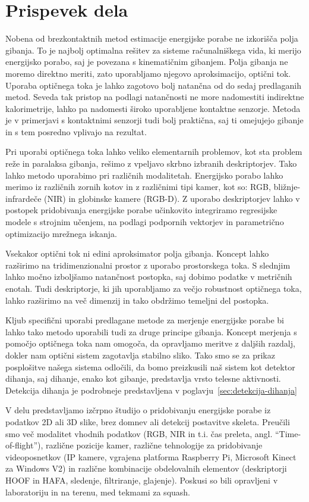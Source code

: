 \section{Prispevek dela}
Nobena od brezkontaktnih metod estimacije energijske porabe ne izkorišča polja gibanja. To je najbolj optimalna rešitev za sisteme računalniškega vida, ki merijo energijsko porabo, saj je povezana s kinematičnim gibanjem. Polja gibanja ne moremo direktno meriti, zato uporabljamo njegovo aproksimacijo, optični tok. Uporaba optičnega toka je lahko zagotovo bolj natančna od do sedaj predlaganih metod. Seveda tak pristop na podlagi natančnosti ne more nadomestiti indirektne kalorimetrije, lahko pa nadomesti široko uporabljene kontaktne senzorje. Metoda je v primerjavi s kontaktnimi senzorji tudi bolj praktična, saj ti omejujejo gibanje in s tem posredno vplivajo na rezultat. 

Pri uporabi optičnega toka lahko veliko elementarnih problemov, kot sta problem reže in paralaksa gibanja, rešimo z vpeljavo skrbno izbranih deskriptorjev. Tako lahko metodo uporabimo pri različnih modalitetah. Energijsko porabo lahko merimo iz različnih zornih kotov in z različnimi tipi kamer, kot so: RGB, bližnje-infrardeče (NIR) in globinske kamere (RGB-D). Z uporabo deskriptorjev lahko v postopek pridobivanja energijske porabe učinkovito integriramo regresijske modele s strojnim učenjem, na podlagi podpornih vektorjev in parametrično optimizacijo mrežnega iskanja. 

Vsekakor optični tok ni edini aproksimator polja gibanja. Koncept lahko razširimo na tridimenzionalni prostor z uporabo prostorskega toka. S slednjim lahko močno izboljšamo natančnost postopka, saj dobimo podatke v metričnih enotah. Tudi deskriptorje, ki jih uporabljamo za večjo robustnost optičnega toka, lahko razširimo na več dimenzij in tako obdržimo temeljni del postopka.

Kljub specifični uporabi predlagane metode za merjenje energijske porabe bi lahko tako metodo uporabili tudi za druge principe gibanja. Koncept merjenja s pomočjo optičnega toka nam omogoča, da opravljamo meritve z daljših razdalj, dokler nam optični sistem zagotavlja stabilno sliko. Tako smo se za prikaz posplošitve našega sistema odločili, da bomo preizkusili naš sistem kot detektor dihanja, saj dihanje, enako kot gibanje, predstavlja vrsto telesne aktivnosti. Detekcija dihanja je podrobneje predstavljena v poglavju~\ref{sec:detekcija-dihanja}

V delu predstavljamo izčrpno študijo o pridobivanju energijske porabe iz podatkov 2D ali 3D slike, brez domnev ali detekcij postavitve skeleta. Preučili smo več modalitet vhodnih podatkov (RGB, NIR in t.i. čas preleta, angl. ``Time-of-flight''), različne pozicije kamer, različne tehnologije za pridobivanje videoposnetkov (IP kamere, vgrajena platforma Raspberry Pi, Microsoft Kinect za Windows V2) in različne kombinacije obdelovalnih elementov (deskriptorji HOOF in HAFA, sledenje, filtriranje, glajenje). Poskusi so bili opravljeni v laboratoriju in na terenu, med tekmami za squash.

